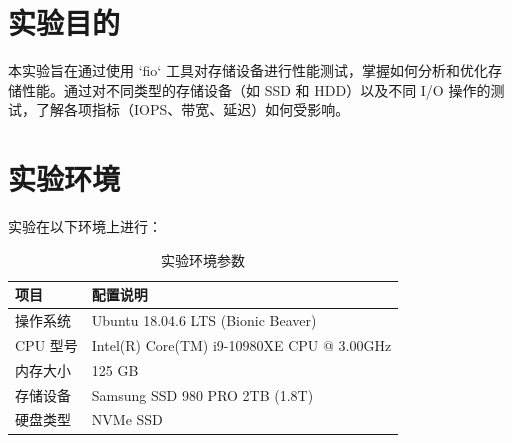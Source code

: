 \documentclass[a4paper]{article}
\begin{document}
\newpage


\section{实验目的}
本实验旨在通过使用 `fio` 工具对存储设备进行性能测试，掌握如何分析和优化存储性能。通过对不同类型的存储设备（如 SSD 和 HDD）以及不同 I/O 操作的测试，了解各项指标（IOPS、带宽、延迟）如何受影响。




\section{实验环境}

实验在以下环境上进行：

\begin{table}[H]
  \centering
  \renewcommand{\arraystretch}{1.25}
  \setlength{\tabcolsep}{10pt}
  \begin{tabular}{ll}
    \toprule
    \textbf{项目} & \textbf{配置说明} \\
    \midrule
    操作系统   & Ubuntu 18.04.6 LTS (Bionic Beaver) \\
    CPU 型号   & Intel(R) Core(TM) i9-10980XE CPU @ 3.00GHz \\
    内存大小   & 125 GB \\
    存储设备   & Samsung SSD 980 PRO 2TB (1.8T) \\
    硬盘类型   & NVMe SSD \\
    \bottomrule
  \end{tabular}
  \caption{实验环境参数}
\end{table}
\end{document}
